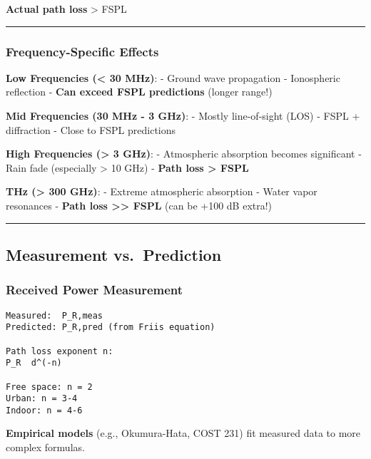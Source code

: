 \textbf{Actual path loss} \textgreater{} FSPL

\begin{center}\rule{0.5\linewidth}{0.5pt}\end{center}

\subsubsection{Frequency-Specific
Effects}\label{frequency-specific-effects}

\textbf{Low Frequencies (\textless{} 30 MHz)}: - Ground wave propagation
- Ionospheric reflection - \textbf{Can exceed FSPL predictions} (longer
range!)

\textbf{Mid Frequencies (30 MHz - 3 GHz)}: - Mostly line-of-sight (LOS)
- FSPL + diffraction - Close to FSPL predictions

\textbf{High Frequencies (\textgreater{} 3 GHz)}: - Atmospheric
absorption becomes significant - Rain fade (especially \textgreater{} 10
GHz) - \textbf{Path loss \textgreater{} FSPL}

\textbf{THz (\textgreater{} 300 GHz)}: - Extreme atmospheric absorption
- Water vapor resonances - \textbf{Path loss \textgreater\textgreater{}
FSPL} (can be +100 dB extra!)

\begin{center}\rule{0.5\linewidth}{0.5pt}\end{center}

\subsection{\texorpdfstring{ Measurement
vs.~Prediction}{ Measurement vs.~Prediction}}\label{measurement-vs.-prediction}

\subsubsection{Received Power
Measurement}\label{received-power-measurement}

\begin{verbatim}
Measured:  P_R,meas
Predicted: P_R,pred (from Friis equation)

Path loss exponent n:
P_R  d^(-n)

Free space: n = 2
Urban: n = 3-4
Indoor: n = 4-6
\end{verbatim}

\textbf{Empirical models} (e.g., Okumura-Hata, COST 231) fit measured
data to more complex formulas.

